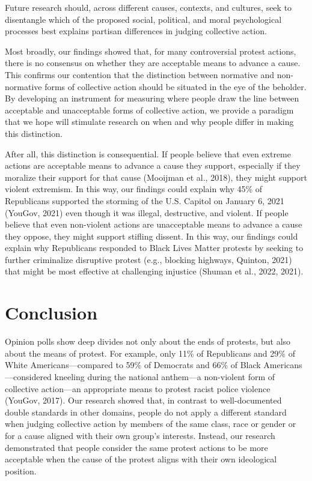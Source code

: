 \documentclass[12pt, letterpaper]{article}
\begin{document}
Future research should, across different causes, contexts, and cultures,
seek to disentangle which of the proposed social, political, and moral
psychological processes best explains partisan differences in judging
collective action.

Most broadly, our findings showed that, for many controversial protest
actions, there is no consensus on whether they are acceptable means to
advance a cause. This confirms our contention that the distinction
between normative and non-normative forms of collective action should be
situated in the eye of the beholder. By developing an instrument for
measuring where people draw the line between acceptable and unacceptable
forms of collective action, we provide a paradigm that we hope will
stimulate research on when and why people differ in making this
distinction.

After all, this distinction is consequential. If people believe that
even extreme actions are acceptable means to advance a cause they
support, especially if they moralize their support for that cause
(Mooijman et al., 2018), they might support violent extremism. In this
way, our findings could explain why 45\% of Republicans supported the
storming of the U.S. Capitol on January 6, 2021 (YouGov, 2021) even
though it was illegal, destructive, and violent. If people believe that
even non-violent actions are unacceptable means to advance a cause they
oppose, they might support stifling dissent. In this way, our findings
could explain why Republicans responded to Black Lives Matter protests
by seeking to further criminalize disruptive protest (e.g., blocking
highways, Quinton, 2021) that might be most effective at challenging
injustice (Shuman et al., 2022, 2021).

\hypertarget{conclusion}{%
\section{Conclusion}\label{conclusion}}

Opinion polls show deep divides not only about the ends of protests, but
also about the means of protest. For example, only 11\% of Republicans
and 29\% of White Americans---compared to 59\% of Democrats and 66\% of
Black Americans---considered kneeling during the national anthem---a
non-violent form of collective action---an appropriate means to protest
racist police violence (YouGov, 2017). Our research showed that, in
contrast to well-documented double standards in other domains, people do
not apply a different standard when judging collective action by members
of the same class, race or gender or for a cause aligned with their own
group's interests. Instead, our research demonstrated that people
consider the same protest actions to be more acceptable when the cause
of the protest aligns with their own ideological position.
\end{document}
